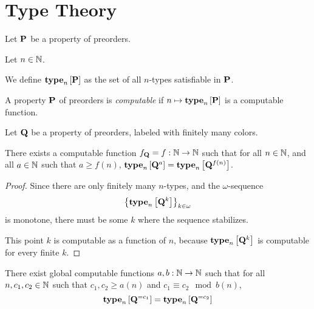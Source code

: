 \section{Type Theory}
\begin{definition}
    Let $\mathbf{P}$ be a property of preorders.

    Let $n \in \mathbb{N}$.

    We define $\mathbf{type}_{n} \left[ {\mathbf{P}} \right]$ as the set of all
    $n$-types satisfiable in $\mathbf{P}$.
\end{definition}

\begin{definition}
    A property $\mathbf{P}$ of preorders is \emph{computable} if
    $n \mapsto \mathbf{type}_{n} \left[ {\mathbf{P}} \right]$ is a computable function.
\end{definition}

\begin{lemma}\label{f-lemma}
    Let $\mathbf{Q}$ be a property of preorders,
    labeled with finitely many colors.

    There exists a computable function $f_{\mathbf{Q}} = f: \mathbb{N} \to \mathbb{N}$ such that
    for all $n \in \mathbb{N}$, and all $a \in \mathbb{N}$ such that $a \ge f(n)$,
    $\mathbf{type}_{n} \left[ {\mathbf{Q}^{a}} \right] = \mathbf{type}_{n} \left[ {\mathbf{Q}^{f(n)}} \right]$.
\end{lemma}

\begin{proof}
    Since there are only finitely many $n$-types,
    and the $\omega$-sequence \[\left\{ {\mathbf{type}_{n} \left[ {\mathbf{Q}^{k}} \right]} \right\}_{k \in \omega}\]
    is monotone,
    there must be some $k$ where the sequence stabilizes.

    This point $k$ is computable as a function of $n$, because
    $\mathbf{type}_{n} \left[ {\mathbf{Q}^{k}} \right]$ is computable for every finite $k$.
\end{proof}

\begin{lemma}\label{ab-lemma}
    There exist global computable functions $a, b : \mathbb{N} \to \mathbb{N}$ such that
    for all $n, c_1, c_2 \in \mathbb{N}$ such that $c_1, c_2 \ge a(n)$ and $c_1 \equiv c_2 \mod b(n)$,
    \[\mathbf{type}_{n} \left[ {\mathbf{Q}^{= c_1}} \right] = \mathbf{type}_{n} \left[ {\mathbf{Q}^{= c_2}} \right]\]
\end{lemma}

